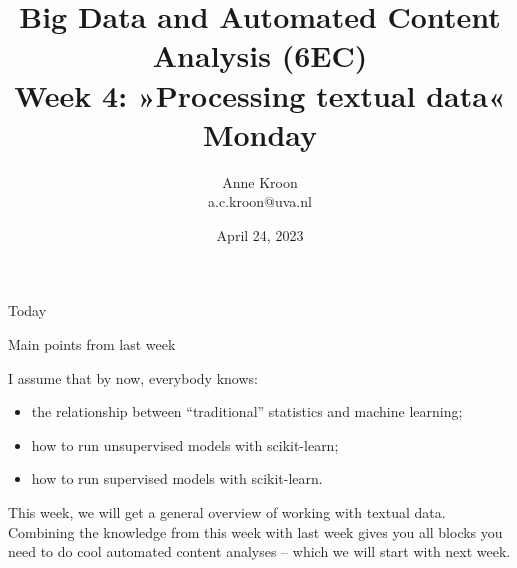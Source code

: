 

\graphicspath{{../../resources/img/}}




\title[Big Data and Automated Content Analysis]{\textbf{Big Data and Automated Content Analysis (6EC)} 
\\Week 4: »Processing textual data«
\\Monday}
\author[Anne Kroon]{Anne Kroon\\ \footnotesize{a.c.kroon@uva.nl}}
\date{April 24, 2023}


\begin{frame}{}
	\titlepage
\end{frame}

\begin{frame}{Today}
	\tableofcontents
\end{frame}





\begin{frame}{Main points from last week}

\begin{alertblock}{I assume that by now, everybody knows:}
\begin{itemize}
\item the relationship between ``traditional'' statistics and machine learning;
\item how to run unsupervised models with scikit-learn;
\item how to run supervised models with scikit-learn.
\end{itemize}
\end{alertblock}
\end{frame}


\begin{frame}[standout]
This week, we will get a general overview of working with textual data. Combining the knowledge from this week with last week gives you all blocks you need to do cool automated content analyses -- which we will start with next week.
\end{frame}














